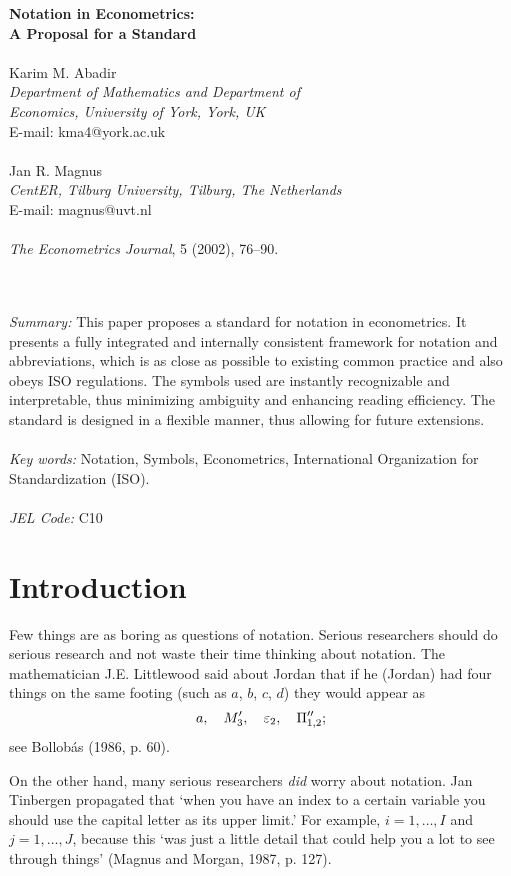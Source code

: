 \documentclass[11pt,dvips,a4paper]{article}
\begin{document}
\begin{center}
\huge
{\bf Notation in Econometrics: \\A Proposal for a Standard}\\
\ \\
\Large
Karim M. Abadir   \\
{\it Department of Mathematics and Department of \\
Economics, University of York, York, UK} \\
E-mail: kma4@york.ac.uk \\
\ \\
Jan R. Magnus\\
{\it CentER, Tilburg University, Tilburg, The Netherlands} \\
E-mail: magnus@uvt.nl \\
\ \\
\emph{The Econometrics Journal}, 5 (2002), 76--90.\\
\end{center}
\ \\
\ \\
\normalsize
\noindent
{\it Summary:} This paper proposes a standard for notation in econometrics.
It presents a fully integrated and internally consistent
framework for notation and abbreviations, which is as close as
possible to existing common practice and also obeys ISO regulations.
The symbols used are instantly recognizable and interpretable,
thus minimizing ambiguity and enhancing reading efficiency.
The standard is designed in a flexible manner,
thus allowing for future extensions. \\
\ \\
{\it Key words:} Notation, Symbols, Econometrics, International
Organization for Standardization (ISO). \\
\ \\
{\it JEL Code:} C10
\setcounter{equation}{0}
\newpage
\section{Introduction}
Few things are as boring as questions of notation. Serious researchers
should do serious research and not waste their time thinking about notation.
The mathematician J.E. Littlewood said about Jordan that if he (Jordan) had
four things on the same footing (such as $a$, $b$, $c$, $d$) they would
appear as
$$
a,\quad
M_3',\quad
\varepsilon_2,\quad
\Pi''_{1,2};
$$
see Bollob\'{a}s (1986, p. 60).

On the other hand, many serious researchers {\it did\/} worry
about notation.
Jan Tinbergen propagated that
`when you have an index to a certain variable you should use
the capital letter as its upper limit.' For example,
$i=1,\dots,I$ and $j=1,\dots,J$, because this
`was just a little detail that could help you a lot
to see through things' (Magnus and Morgan, 1987, p. 127).
\end{document}
